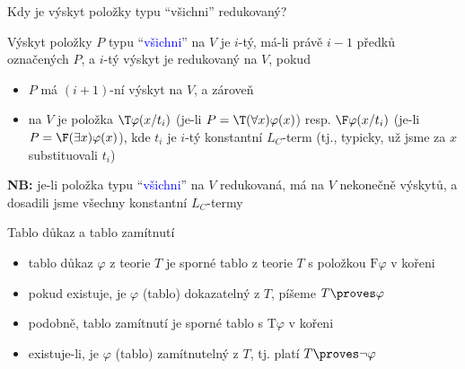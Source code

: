 \documentclass{beamer}
\begin{document}
\begin{frame}{Kdy je výskyt položky typu ``všichni'' redukovaný?}
    
    \pause
    Výskyt položky $P$ typu ``\textcolor{blue}{všichni}'' na $V$ je \alert{$i$-tý}, má-li právě $i-1$ předků označených $P$, a \alert{$i$-tý výskyt je redukovaný} na $V$, pokud\pause
    \begin{itemize}
        \item $P$ má $(i+1)$-ní výskyt na $V$, a zároveň\pause
        \item na $V$ je položka \alert{$\T\varphi(x/t_i)$} (je-li $P=\T(\forall x)\varphi(x)$) resp. \alert{$\F\varphi(x/t_i)$} (je-li $P=\F(\exists x)\varphi(x)$), kde $t_i$ je $i$-tý konstantní $L_C$-term (tj., typicky, už jsme za $x$ substituovali $t_i$)\pause
    \end{itemize} 


    \textbf{NB:} je-li položka typu ``\textcolor{blue}{všichni}'' na $V$ redukovaná, má na $V$ nekonečně výskytů, a dosadili jsme všechny konstantní $L_C$-termy

\end{frame}


\begin{frame}{Tablo důkaz a tablo zamítnutí}

    \begin{itemize}[<+->]
        \item \alert{tablo důkaz}  $\varphi$ z teorie $T$ je \alert{sporné} tablo z teorie $T$ s položkou $\mathrm{F}\varphi$ v kořeni
        \item pokud existuje, je $\varphi$ \alert{(tablo) dokazatelný} z $T$, píšeme \alert{$T\proves\varphi$}
        \item podobně, \alert{tablo zamítnutí} je sporné tablo s $\mathrm{T}\varphi$ v kořeni
        \item existuje-li, je $\varphi$ \alert{(tablo) zamítnutelný} z $T$, tj. platí \alert{$T\proves\neg\varphi$}
    \end{itemize}

\end{frame}
\end{document}
